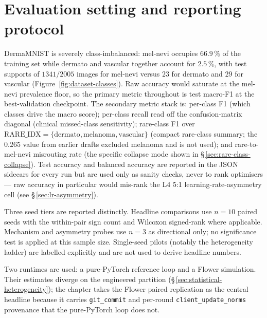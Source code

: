 \documentclass[11pt,a4paper]{report}
\begin{document}

\section{Evaluation setting and reporting protocol}
\label{sec:eval-setting}

DermaMNIST is severely class-imbalanced: mel-nevi occupies $66.9\,\%$ of
the training set while dermato and vascular together account for $2.5\,\%$,
with test supports of $1341/2005$ images for mel-nevi versus $23$ for
dermato and $29$ for vascular (Figure~\ref{fig:dataset-classes}). Raw
accuracy would saturate at the mel-nevi prevalence floor, so the primary
metric throughout is test macro-F1 at the best-validation checkpoint. The
secondary metric stack is: per-class F1 (which classes drive the macro
score); per-class recall read off the confusion-matrix diagonal (clinical
missed-class sensitivity); rare-class F1 over
$\mathrm{RARE\_IDX} = \{\text{dermato}, \text{melanoma}, \text{vascular}\}$
(compact rare-class summary; the $0.265$ value from earlier drafts excluded
melanoma and is not used); and rare-to-mel-nevi misrouting rate (the
specific collapse mode shown in \S\,\ref{sec:rare-class-collapse}). Test
accuracy and balanced accuracy are reported in the JSON sidecars for every
run but are used only as sanity checks, never to rank optimisers --- raw
accuracy in particular would mis-rank the L4 5:1 learning-rate-asymmetry
cell (see \S\,\ref{sec:lr-asymmetry}).

Three seed tiers are reported distinctly. Headline comparisons use $n = 10$
paired seeds with the within-pair sign count and Wilcoxon signed-rank where
applicable. Mechanism and asymmetry probes use $n = 3$ as directional only;
no significance test is applied at this sample size. Single-seed pilots
(notably the heterogeneity ladder) are labelled explicitly and are not used
to derive headline numbers.

Two runtimes are used: a pure-PyTorch reference loop and a Flower
simulation. Their estimates diverge on the engineered partition
(\S\,\ref{sec:statistical-heterogeneity}); the chapter takes the Flower
paired replication as the central headline because it carries
\texttt{git\_commit} and per-round \texttt{client\_update\_norms} provenance
that the pure-PyTorch loop does not.
\end{document}
